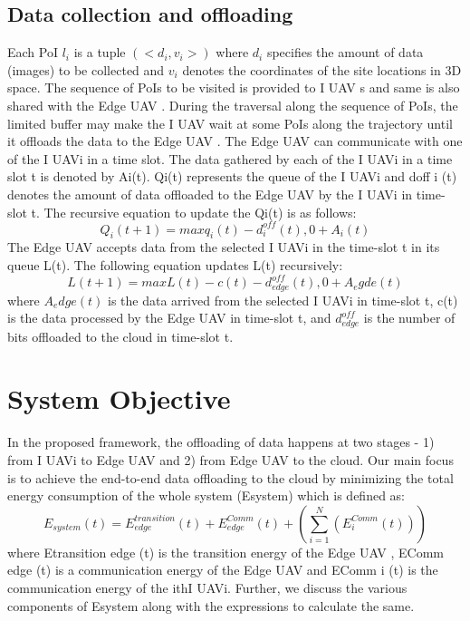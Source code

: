 \documentclass{article}
\begin{document}
\begin{multicols}{2}
\subsection{Data collection and offloading}
Each PoI $l_i$ is a tuple $(< d_i, v_i>)$ where $ d_i$ specifies the
amount of data (images) to be collected and $v_i$ denotes the
coordinates of the site locations in 3D space. The sequence
of PoIs to be visited is provided to I UAV s and same is
also shared with the Edge UAV . During the traversal
along the sequence of PoIs, the limited buffer may make
the I UAV wait at some PoIs along the trajectory until
it offloads the data to the Edge UAV .
The Edge UAV can communicate with one of the
I UAVi in a time slot. The data gathered by each of
the I UAVi in a time slot t is denoted by Ai(t). Qi(t)
represents the queue of the I UAVi and doff
i (t) denotes the amount of data offloaded to the Edge UAV by the
I UAVi in time-slot t. The recursive equation to update
the Qi(t) is as follows: 
\begin{equation}
    Q_i(t+1)=max{q_i(t)-d_i^{off}(t),0}+A_i(t)
\end{equation}
The Edge UAV accepts data from the selected I UAVi
in the time-slot t in its queue L(t). The following equation
updates L(t) recursively:
\begin{equation}
    L(t+1)=max{L(t)-c(t)-d_{edge}^{off}(t),0+A_egde(t)}
\end{equation}
where $A_edge(t)$ is the data arrived from the selected
I UAVi in time-slot t, c(t) is the data processed by the
Edge UAV in time-slot t, and $d_{edge}^{off}$ is the number of
bits offloaded to the cloud in time-slot t.

\section{System Objective}
In the proposed framework, the offloading of data happens
at two stages - 1) from I UAVi to Edge UAV and 2) from
Edge UAV to the cloud. Our main focus is to achieve the
end-to-end data offloading to the cloud by minimizing the
total energy consumption of the whole system (Esystem)
which is defined as:
\begin{equation}
    E_{system}(t)=E_{edge}^{transition}(t)+E_{edge}^{Comm}(t)+(\sum_{i=1}^N(E_i^{Comm}(t)))
\end{equation}
where Etransition
edge (t) is the transition energy of the
Edge UAV , EComm
edge (t) is a communication energy of the
Edge UAV and EComm
i (t) is the communication energy
of the ithI UAVi.
Further, we discuss the various components of Esystem
along with the expressions to calculate the same.


\end{multicols}
\end{document}
